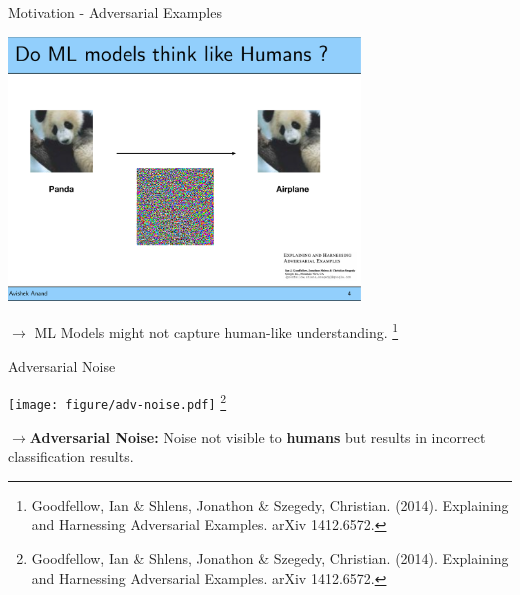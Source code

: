 \documentclass[11pt,compress,t,notes=noshow, aspectratio=169, xcolor=table]{beamer}
\begin{document}
\begin{frame}{Motivation - Adversarial Examples}

    \begin{center}
    \includegraphics[width=0.7\textwidth]{figure/panda-airplane.pdf}
    \end{center}
	\bigskip

	$\rightarrow$ ML Models might not capture human-like understanding.
    \footnote[frame]{Goodfellow, Ian \& Shlens, Jonathon \& Szegedy, Christian. (2014). Explaining and Harnessing Adversarial Examples. arXiv 1412.6572.}
\end{frame}


\begin{frame}{Adversarial Noise}
    \begin{center}
    \texttt{[image: figure/adv-noise.pdf]}    \footnote[frame]{Goodfellow, Ian \& Shlens, Jonathon \& Szegedy, Christian. (2014). Explaining and Harnessing Adversarial Examples. arXiv 1412.6572.}
	\end{center}
	\normalsize
	$\rightarrow$\textbf{Adversarial Noise:} Noise not visible to \textbf{humans} but results in incorrect classification results.
\end{frame}

\endlecture
\end{document}
